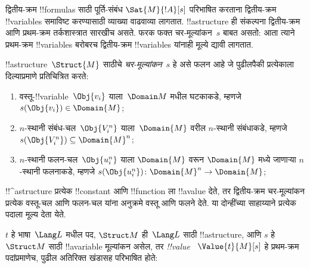 \documentclass[../../../include/open-logic-section]{subfiles}
\begin{document}


\begin{explain}
द्वितीय-क्रम
!!{formula}s साठी
पूर्ति-संबंध
$\Sat{M}{!A}[s]$
परिभाषित करताना
द्वितीय-क्रम
!!{variable}s
समाविष्ट करण्यासाठी
व्याख्या वाढवाव्या
लागतात.
!!a{structure}
ही संकल्पना
द्वितीय-क्रम
आणि प्रथम-क्रम
तर्कशास्त्रात
सारखीच असते.
फरक फक्त
चर-मूल्यांकन~$s$
बाबत असतो:
आता त्याने
प्रथम-क्रम
!!{variable}s
बरोबरच
द्वितीय-क्रम
!!{variable}s
यांनाही मूल्ये
द्यावी लागतात.
\end{explain}

\begin{defn}[चर-मूल्यांकन]
!!a{structure}~$\Struct{M}$
साठीचे
\emph{चर-मूल्यांकन}~$s$
हे असे फलन
आहे जे पुढीलपैकी
प्रत्येकाला
दिल्याप्रमाणे
प्रतिचित्रित करते:
\begin{enumerate}
\item वस्तू-!!{variable}~$\Obj{v_i}$
  याला~$\Domain M$
  मधील घटकाकडे,
  म्हणजे
  $s(\Obj{v_i}) \in \Domain{M}$;
\item $n$-स्थानी
  संबंध-चल~$\Obj{V_i^n}$
  याला~$\Domain{M}$
  वरील $n$-स्थानी
  संबंधाकडे,
  म्हणजे
  $s(\Obj{V_i^n}) \subseteq \Domain{M}^n$;
\item $n$-स्थानी
  फलन-चल~$\Obj{u_i^n}$
  याला
  $\Domain{M}$
  वरून $\Domain{M}$
  मध्ये जाणाऱ्या
  $n$-स्थानी
  फलनाकडे,
  म्हणजे
  $s(\Obj{u_i^n})\colon \Domain{M}^n \to \Domain{M}$;
\end{enumerate}
\end{defn}

\begin{explain}
!!^a{structure}
प्रत्येक !!{constant}
आणि !!{function}
ला !!a{value}
देते, तर द्वितीय-क्रम
चर-मूल्यांकन
प्रत्येक वस्तू-चल
आणि फलन-चल
यांना अनुक्रमे
वस्तू आणि फलने
देते. या दोन्हींच्या
साहाय्याने
प्रत्येक पदाला
मूल्य देता येते.
\end{explain}

\begin{defn}
$t$ हे भाषा~$\Lang L$
मधील पद,
$\Struct M$ ही~$\Lang L$
साठी !!a{structure},
आणि $s$ हे~$\Struct M$
साठी !!a{variable}
मूल्यांकन असेल,
तर \emph{!!{value}}~
$\Value{t}{M}[s]$
हे प्रथम-क्रम
पदांप्रमाणेच,
पुढील अतिरिक्त
खंडासह परिभाषित
होते:
\begin{quote}
\end{quote}
\end{defn}
\end{document}
